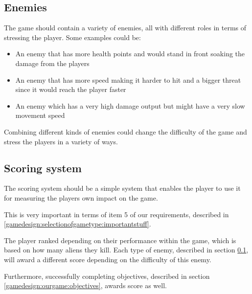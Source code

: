 \subsection{Enemies}\label{gamedesign:ourgame:enemies}
The game should contain a variety of enemies, all with different roles in terms of stressing the player.
Some examples could be:
\begin{itemize}
\item An enemy that has more health points and would stand in front soaking the damage from the players
\item An enemy that has more speed making it harder to hit and a bigger threat since it would reach the player faster
\item An enemy which has a very high damage output but might have a very slow movement speed
\end{itemize}
Combining different kinds of enemies could change the difficulty of the game and stress the players in a variety of ways.

\subsection{Scoring system}\label{gamedesign:ourgame:scoring}
The scoring system should be a simple system that enables the player to use it for measuring the players own impact on the game.

This is very important in terms of item 5 of our requirements, described in \ref{gamedesign:selectionofgametype:importantstuff}.

The player ranked depending on their performance within the game, which is based on how many aliens they kill.
Each type of enemy, described in section \ref{gamedesign:ourgame:enemies}, will award a different score depending on the difficulty of this enemy.

Furthermore, successfully completing objectives, described in section \ref{gamedesign:ourgame:objectives}, awards score as well.

